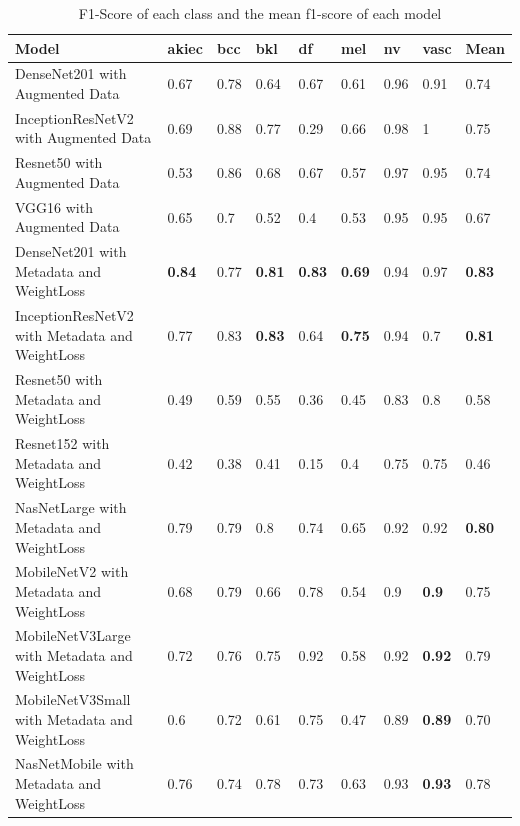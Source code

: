 \documentclass[sensors,article,submit,pdftex,moreauthors]{Definitions/mdpi}
\begin{document}
\begin{table}[h]
	\centering
	\begin{tabular}{|p{5cm} | p{0.6cm} | p{0.6cm} | p{0.6cm} | p{0.6cm} | p{0.6cm} | p{0.6cm} | p{0.6cm} | p{0.7cm}|} 
		\hline
		Model & akiec & bcc & bkl & df & mel & nv & vasc & Mean \\
		\hline
		DenseNet201 with Augmented Data & 0.67 & 0.78 & 0.64 & 0.67 & 0.61 & 0.96 & 0.91 & 0.74 \\ 
		\hline
		InceptionResNetV2 with Augmented Data & 0.69 &	0.88 & 0.77 & 0.29 & 0.66 & 0.98 & 1 & 0.75\\
		\hline
		Resnet50 with Augmented Data & 0.53 & 0.86 & 0.68 & 0.67 & 0.57 & 0.97 & 0.95 & 0.74\\
		\hline 	
		VGG16 with Augmented Data & 0.65 & 0.7 & 0.52 & 0.4 & 0.53 & 0.95 & 0.95 & 0.67\\ 
		\hline		
		DenseNet201 with Metadata and WeightLoss & \textbf{0.84} & 0.77 & \textbf{0.81} & \textbf{0.83} & \textbf{0.69} & 0.94 & 0.97 & \textbf{0.83}\\
		\hline
		InceptionResNetV2 with Metadata and WeightLoss & 0.77 & 0.83 & \textbf{0.83} & 0.64 & \textbf{0.75} & 0.94 & 0.7 & \textbf{0.81}\\
		\hline
		Resnet50 with Metadata and WeightLoss & 0.49 & 0.59 & 0.55 & 0.36 & 0.45 & 0.83 & 0.8 & 0.58\\
		\hline
		Resnet152 with Metadata and WeightLoss & 0.42 & 0.38 & 0.41 & 0.15 & 0.4 & 0.75 & 0.75 & 0.46\\
		\hline
		NasNetLarge with Metadata and WeightLoss & 0.79 & 0.79 & 0.8 & 0.74 & 0.65 & 0.92 & 0.92 & \textbf{0.80}\\
		\hline
		MobileNetV2 with Metadata and WeightLoss & 0.68 & 0.79 & 0.66 & 0.78 & 0.54 & 0.9 & \textbf{0.9} & 0.75\\
		\hline
		MobileNetV3Large with Metadata and WeightLoss & 0.72 & 0.76 & 0.75 & 0.92 & 0.58 & 0.92 & \textbf{0.92} & 0.79\\
		\hline
		MobileNetV3Small with Metadata and WeightLoss & 0.6 & 0.72 & 0.61 & 0.75 & 0.47 & 0.89 & \textbf{0.89} & 0.70\\
		\hline
		NasNetMobile with Metadata and WeightLoss & 0.76 & 0.74 & 0.78 & 0.73 & 0.63 & 0.93 & \textbf{0.93} & 0.78\\
		\hline
	\end{tabular}
	\caption{F1-Score of each class and the mean f1-score of each model}
	\label{table:5}
\end{table}
\end{document}
